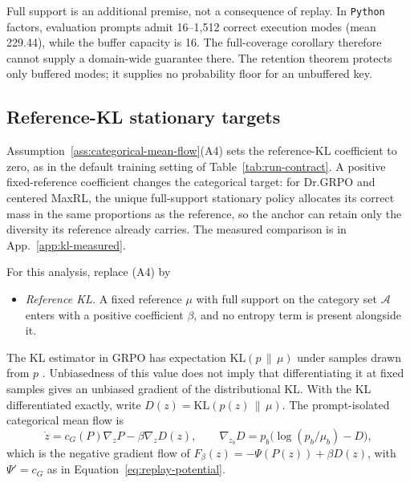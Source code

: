 Full support is an additional premise, not a consequence of replay. In
\texttt{Python} factors, evaluation prompts admit 16--1{,}512 correct execution
modes (mean 229.44), while the buffer capacity is 16. The
full-coverage corollary therefore cannot supply a domain-wide guarantee there. The retention theorem protects only
buffered modes; it supplies no probability floor for an unbuffered key.

\subsection{Reference-KL stationary targets}
\label{app:theory-kl}

Assumption~\ref{ass:categorical-mean-flow}(A4) sets the reference-KL
coefficient to zero, as in the default training setting of
Table~\ref{tab:run-contract}. A positive fixed-reference coefficient changes
the categorical target: for Dr.GRPO and centered MaxRL, the unique
full-support stationary policy allocates its correct mass in the same
proportions as the reference, so the anchor can retain only the diversity its
reference already carries. The measured comparison is in
App.~\ref{app:kl-measured}.

For this analysis, replace (A4) by

\begin{itemize}
\item[(A4$'$)] \emph{Reference KL.} A fixed reference $\mu$ with full support
  on the category set $\mathcal A$ enters with a positive coefficient $\beta$,
  and no entropy term is present alongside it.
\end{itemize}
The KL estimator in GRPO has expectation $\mathrm{KL}(p\,\|\,\mu)$
under samples drawn from $p$ \citep{shao2024deepseekmath}. Unbiasedness of
this value does not imply that differentiating it at fixed samples gives an
unbiased gradient of the distributional KL. With the KL differentiated
exactly, write $D(z)=\mathrm{KL}(p(z)\,\|\,\mu)$. The prompt-isolated
categorical mean flow is
\begin{equation}
  \dot z=c_G(P)\nabla_zP-\beta\nabla_zD(z),
  \qquad
  \nabla_{z_b}D=p_b\big(\log(p_b/\mu_b)-D\big),
  \label{eq:kl-mean-flow}
\end{equation}
which is the negative gradient flow of
$F_\beta(z)=-\Psi(P(z))+\beta D(z)$, with $\Psi'=c_G$ as in
Equation~\eqref{eq:replay-potential}.

